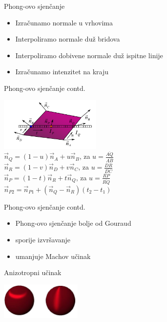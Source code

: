 \documentclass[9pt]{beamer}
\begin{document}
\begin{frame}{Phong-ovo sjenčanje}       
	\begin{itemize}%
		\item Izračunamo normale u vrhovima
		\item Interpoliramo normale duž bridova
		\item Interpoliramo dobivene normale duž ispitne linije
		\item Izračunamo intenzitet na kraju
	\end{itemize}
\end{frame}


\begin{frame}{Phong-ovo sjenčanje contd. }
	\begin{center}
		\includegraphics[width=5cm]{slike/10_phong1.png}\\
		$\vec{n}_{Q} =(1-u)\vec{n}_{A}+u\vec{n}_{B}$, za $u=\frac{\overline{AQ}}{\overline{AB}}$\\
		$\vec{n}_{R} =(1-v)\vec{n}_{D}+v\vec{n}_{C}$, za $u=\frac{\overline{DR}}{\overline{DC}}$\\
		$\vec{n}_{P} =(1-t)\vec{n}_{R}+t\vec{n}_{Q}$, za $u=\frac{\overline{RP}}{\overline{RQ}}$\\
		$\vec{n}_{P2} =\vec{n}_{P1} + (\vec{n}_{Q}-\vec{n}_{R})(t_{2}-t_{1})$
	\end{center}
\end{frame}

\begin{frame}{Phong-ovo sjenčanje contd.}
	\begin{itemize}%
		\item Phong-ovo sjenčanje bolje od Gouraud
		\item sporije izvršavanje
		\item umanjuje Machov učinak
	\end{itemize}
	Anizotropni učinak
	\begin{center}
		\includegraphics[width=4cm]{slike/10_phong2.png}
	\end{center}
\end{frame}
\end{document}
